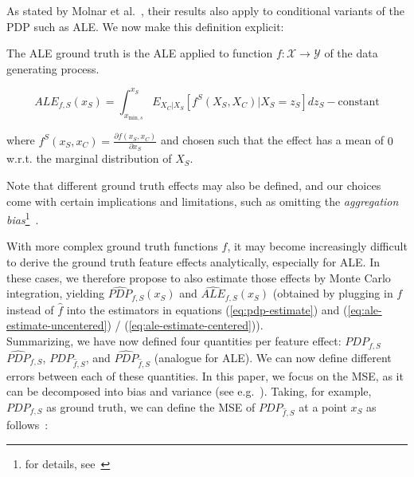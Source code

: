 \documentclass[runningheads]{llncs}
\begin{document}
As stated by Molnar et al.~\cite{molnar_relating_2023}, their results also
apply to conditional variants of the PDP such as ALE. We now make this
definition explicit:

\begin{definition}
    The ALE ground truth is the ALE applied to function $f : \mathcal{X} \xrightarrow{} \mathcal{Y}$ of the data generating process.

    \begin{equation}
        ALE_{f,S}(x_S) = \int_{x_{\text{min},s}}^{x_S} E_{X_C|X_S} \left[f^S(X_S, X_C)|X_S = z_S\right] dz_S - \text{constant}
    \end{equation}

    \noindent where $f^S(x_S, x_C) = \frac{\partial f(x_S, x_C)}{\partial x_S}$ and  chosen such that the effect has a mean of $0$ w.r.t. the marginal distribution of $X_S$.
\end{definition}

Note that different ground truth effects may also be defined, and our choices
come with certain implications and limitations, such as omitting the
\textit{aggregation bias}\footnote{for details,
    see~\cite{herbinger_repid_2022}}~\cite{mehrabi_survey_2021}.

With more complex ground truth functions $f$, it may become increasingly
difficult to derive the ground truth feature effects analytically, especially
for ALE. In these cases, we therefore propose to also estimate those effects by
Monte Carlo integration, yielding $\widehat{PDP}_{f,S}(x_S)$ and
$\widehat{ALE}_{f,S}(x_S)$ (obtained by plugging in $f$ instead of $\hat f$
into the estimators in equations (\ref{eq:pdp-estimate}) and
(\ref{eq:ale-estimate-uncentered}) / (\ref{eq:ale-estimate-centered})).\\

\noindent Summarizing, we have now defined four quantities per feature effect:
$PDP_{f,S}$ $\widehat{PDP}_{f,S}$, $PDP_{\hat f,S}$, and $\widehat{PDP}_{\hat f,S}$
(analogue for ALE). We can now define different errors between each of these
quantities. In this paper, we focus on the MSE, as it can be decomposed into
bias and variance (see e.g.~\cite{geman_neural_1992}).
Taking, for example, $PDP_{f,S}$ as ground truth, we can define the MSE of
$PDP_{\hat f,S}$ at a point $x_S$ as follows~\cite{molnar_relating_2023}:
\end{document}
